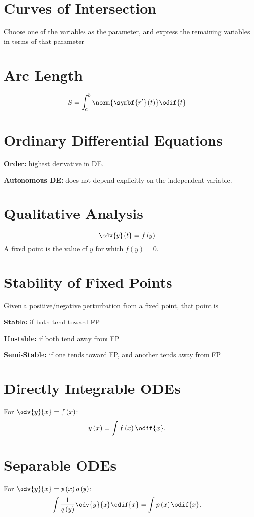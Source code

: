 \documentclass{article}
\begin{document}
\begin{multicols}{3}
    \section*{Curves of Intersection}
    Choose one of the variables as the parameter, and express the remaining variables in terms of that parameter.
    \section*{Arc Length}
    \begin{equation*}
        S = \int_a^b \norm{\symbf{r'}\left( t \right)} \odif{t}
    \end{equation*}
    \section*{Ordinary Differential Equations}
    \textbf{Order:} highest derivative in DE\@.

    \textbf{Autonomous DE:} does not depend explicitly on the independent variable.
    \section*{Qualitative Analysis}
    \begin{equation*}
        \odv{y}{t} = f\left( y \right)
    \end{equation*}
    A fixed point is the value of \(y\) for which \(f\left( y \right) = 0\).
    \section*{Stability of Fixed Points}
    Given a positive/negative perturbation from a fixed point, that point is

    \textbf{Stable:} if both tend toward FP

    \textbf{Unstable:} if both tend away from FP

    \textbf{Semi-Stable:} if one tends toward FP, and another tends away from FP
    \section*{Directly Integrable ODEs}
    For \(\odv{y}{x} = f\left( x \right)\):
    \begin{equation*}
        y\left( x \right) = \int f\left( x \right) \odif{x}.
    \end{equation*}
    \section*{Separable ODEs}
    For \(\odv{y}{x} = p\left( x \right) q\left( y \right)\):
    \begin{equation*}
        \int \frac{1}{q\left( y \right)} \odv{y}{x} \odif{x} = \int p\left( x \right) \odif{x}.
    \end{equation*}

\end{multicols}
\end{document}
